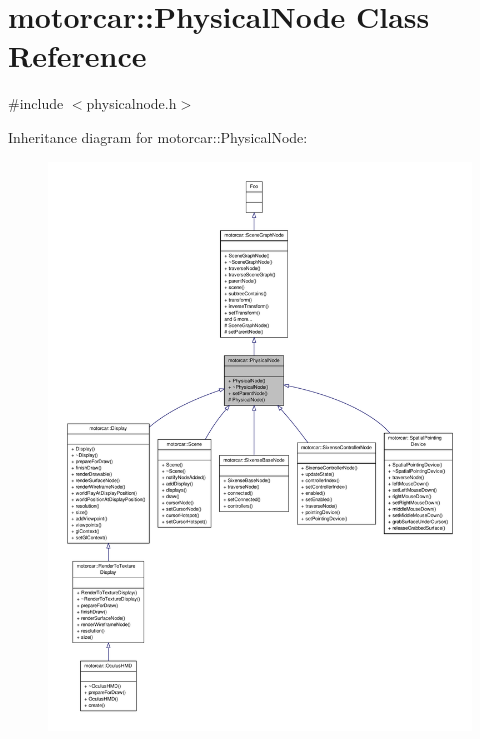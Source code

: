 \hypertarget{classmotorcar_1_1PhysicalNode}{\section{motorcar\-:\-:Physical\-Node Class Reference}
\label{classmotorcar_1_1PhysicalNode}
}


{\ttfamily \#include $<$physicalnode.\-h$>$}



Inheritance diagram for motorcar\-:\-:Physical\-Node\-:
\nopagebreak
\begin{figure}[H]
\begin{center}
\leavevmode
\includegraphics[width=350pt]{classmotorcar_1_1PhysicalNode__inherit__graph}
\end{center}
\end{figure}


